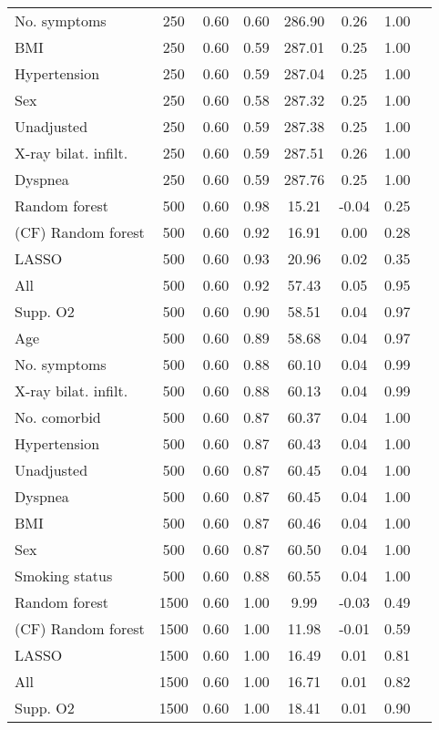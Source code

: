 \documentclass{article}
\begin{document}
{\begin{longtable}{lccccccc}
No. symptoms & 250 & 0.60 & 0.60 & 286.90 &  0.26 & 1.00 \\ 
BMI & 250 & 0.60 & 0.59 & 287.01 &  0.25 & 1.00 \\ 
Hypertension & 250 & 0.60 & 0.59 & 287.04 &  0.25 & 1.00 \\ 
Sex & 250 & 0.60 & 0.58 & 287.32 &  0.25 & 1.00 \\ 
Unadjusted & 250 & 0.60 & 0.59 & 287.38 &  0.25 & 1.00 \\ 
X-ray bilat. infilt. & 250 & 0.60 & 0.59 & 287.51 &  0.26 & 1.00 \\ 
Dyspnea & 250 & 0.60 & 0.59 & 287.76 &  0.25 & 1.00 \\ \midrule() 
Random forest & 500 & 0.60 & 0.98 &  15.21 & -0.04 & 0.25 \\ 
(CF) Random forest & 500 & 0.60 & 0.92 &  16.91 &  0.00 & 0.28 \\ 
LASSO & 500 & 0.60 & 0.93 &  20.96 &  0.02 & 0.35 \\ 
All & 500 & 0.60 & 0.92 &  57.43 &  0.05 & 0.95 \\ 
Supp. O2 & 500 & 0.60 & 0.90 &  58.51 &  0.04 & 0.97 \\ 
Age & 500 & 0.60 & 0.89 &  58.68 &  0.04 & 0.97 \\ 
No. symptoms & 500 & 0.60 & 0.88 &  60.10 &  0.04 & 0.99 \\ 
X-ray bilat. infilt. & 500 & 0.60 & 0.88 &  60.13 &  0.04 & 0.99 \\ 
No. comorbid & 500 & 0.60 & 0.87 &  60.37 &  0.04 & 1.00 \\ 
Hypertension & 500 & 0.60 & 0.87 &  60.43 &  0.04 & 1.00 \\ 
Unadjusted & 500 & 0.60 & 0.87 &  60.45 &  0.04 & 1.00 \\ 
Dyspnea & 500 & 0.60 & 0.87 &  60.45 &  0.04 & 1.00 \\ 
BMI & 500 & 0.60 & 0.87 &  60.46 &  0.04 & 1.00 \\ 
Sex & 500 & 0.60 & 0.87 &  60.50 &  0.04 & 1.00 \\ 
Smoking status & 500 & 0.60 & 0.88 &  60.55 &  0.04 & 1.00 \\ \midrule() 
Random forest & 1500 & 0.60 & 1.00 &   9.99 & -0.03 & 0.49 \\ 
(CF) Random forest & 1500 & 0.60 & 1.00 &  11.98 & -0.01 & 0.59 \\ 
LASSO & 1500 & 0.60 & 1.00 &  16.49 &  0.01 & 0.81 \\ 
All & 1500 & 0.60 & 1.00 &  16.71 &  0.01 & 0.82 \\ 
Supp. O2 & 1500 & 0.60 & 1.00 &  18.41 &  0.01 & 0.90 \\ 

\end{longtable}}
\end{document}
